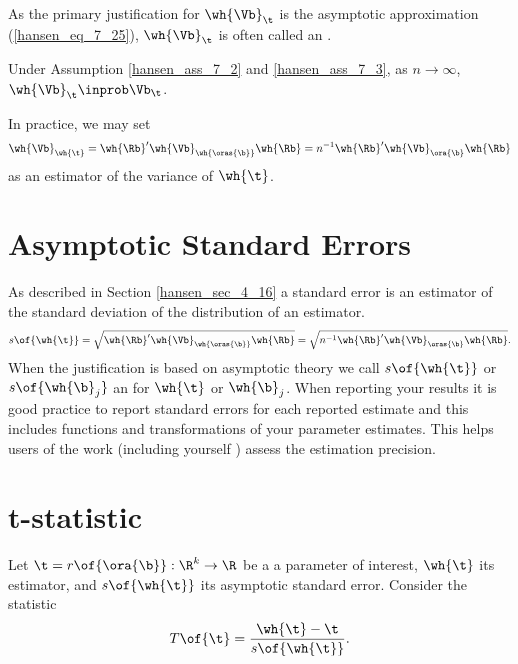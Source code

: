 As the primary justification for $\wh{\Vb}_\t$ is the asymptotic approximation (\ref{hansen_eq_7_25}), $ \wh{\Vb}_\t$ is often called an .

\begin{theorem}
    \label{hansen_thm_7_10}
    Under Assumption \ref{hansen_ass_7_2} and \ref{hansen_ass_7_3}, as $n \rightarrow \infty$, $\wh{\Vb}_\t \inprob \Vb_{\t}$.
\end{theorem}

In practice, we may set 
\begin{equation}
    \label{hansen_eq_7_30}
    \wh{\Vb}_{\wh{\t}} = \wh{\Rb}^\prime \wh{\Vb}_{\wh{\oras{\b}}} \wh{\Rb} = n^{-1} \wh{\Rb}^\prime \wh{\Vb}_{\ora{\b}} \wh{\Rb}
\end{equation}
as an estimator of the variance of $\wh{\t}$.

\section{Asymptotic Standard Errors}

As described in Section \ref{hansen_sec_4_16} a standard error is an estimator of the standard deviation of the distribution of an estimator.
\begin{equation}
    \notag
    s\of{\wh{\t}} = \sqrt{\wh{\Rb}^\prime \wh{\Vb}_{\wh{\oras{\b}}} \wh{\Rb}} = \sqrt{n^{-1} \wh{\Rb}^\prime \wh{\Vb}_{\oras{\b}} \wh{\Rb}}.
\end{equation}
When the justification is based on asymptotic theory we call $s\of{\wh{\t}}$ or $s\of{\wh{\b}_j}$ an  for $\wh{\t}$ or $\wh{\b}_j$. When reporting your results it is good practice to report standard errors for each reported estimate and this includes functions and transformations of your parameter estimates. This helps users of the work (including yourself ) assess the estimation precision.


\section{t-statistic}
\setcounter{equation}{32}

Let $\t = r\of{\ora{\b}}: \R^k \rightarrow \R$ be a a parameter of interest, $\wh{\t}$ its estimator, and $s\of{\wh{\t}}$ its asymptotic standard error. Consider the statistic 
\begin{equation}
    \label{hansen_eq_7_33}
    T\of{\t} = \frac{\wh{\t} - \t}{s\of{\wh{\t}}}.
\end{equation}


